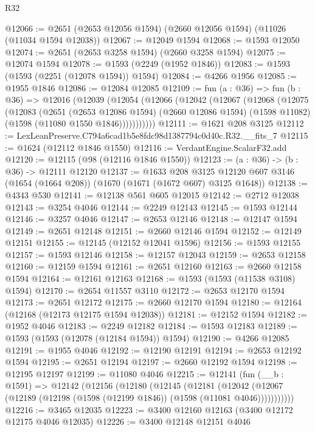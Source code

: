 \begin{lexlean}{R32}
\begin{coremodule}
@12066 := @2651 (@2653 @12056 @1594) (@2660 @12056 @1594) (@11026 (@11034 @1594 @12038))
@12067 := @12049 @1594
@12068 := @1593 @12050
@12074 := @2651 (@2653 @3258 @1594) (@2660 @3258 @1594)
@12075 := @12074 @1594
@12078 := @1593 (@2249 (@1952 @1846))
@12083 := @1593 (@1593 (@2251 (@12078 @1594)) @1594)
@12084 := @4266 @1956
@12085 := @1955 @1846
@12086 := @12084 @12085
@12109 := fun (a : @36) =>
  fun (b : @36) =>
  @12016
    (@12039
      (@12054
        (@12066
          (@12042
            (@12067
              (@12068
                (@12075
                  (@12083
                    (@2651
                      (@2653 @12086 @1594)
                      (@2660 @12086 @1594)
                      (@1598 @11082)
                      (@1598 (@11080 @1550 @1846)))))))))))
@12111 := @1621 @208 @3125
@12112 := LexLeanPreserve.C794a6cad1b5e8fdc98d1387794c0d40c.R32.__fits_7
@12115 := @1624 (@12112 @1846 @1550)
@12116 := VerdantEngine.ScalarF32.add
@12120 := @12115 (@98 (@12116 @1846 @1550))
@12123 := (a : @36) -> (b : @36) -> @12111 @12120
@12137 := @1633
    @208
    @3125
    @12120
    @607
    @3146
    (@1654 (@1664 @208))
    (@1670 (@1671 (@1672 @607) @3125 @1648))
@12138 := @4343 @530
@12141 := @12138 @561 @605 @12015
@12142 := @2712 @12038
@12143 := @3254 @4046
@12144 := @2249 @12143
@12145 := @1593 @12144
@12146 := @3257 @4046
@12147 := @2653 @12146
@12148 := @12147 @1594
@12149 := @2651 @12148
@12151 := @2660 @12146 @1594
@12152 := @12149 @12151
@12155 := @12145 (@12152 @12041 @1596)
@12156 := @1593 @12155
@12157 := @1593 @12146
@12158 := @12157 @12043
@12159 := @2653 @12158
@12160 := @12159 @1594
@12161 := @2651 @12160
@12163 := @2660 @12158 @1594
@12164 := @12161 @12163
@12168 := @1593 (@1593 (@11538 @3108) @1594)
@12170 := @2654 @11557 @3110
@12172 := @2653 @12170 @1594
@12173 := @2651 @12172
@12175 := @2660 @12170 @1594
@12180 := @12164 (@12168 (@12173 @12175 @1594 @12038))
@12181 := @12152 @1594
@12182 := @1952 @4046
@12183 := @2249 @12182
@12184 := @1593 @12183
@12189 := @1593 (@1593 (@12078 (@12184 @1594)) @1594)
@12190 := @4266 @12085
@12191 := @1955 @4046
@12192 := @12190 @12191
@12194 := @2653 @12192 @1594
@12195 := @2651 @12194
@12197 := @2660 @12192 @1594
@12198 := @12195 @12197
@12199 := @11080 @4046
@12215 := @12141
    (fun (__b : @1591) =>
    @12142
      (@12156
        (@12180
          (@12145
            (@12181
              (@12042 (@12067 (@12189 (@12198 (@1598 (@12199 @1846)) (@1598 (@11081 @4046)))))))))))
@12216 := @3465 @12035
@12223 := @3400 @12160 @12163 (@3400 @12172 @12175 @4046 @12035)
@12226 := @3400 @12148 @12151 @4046

\end{coremodule}
\end{lexlean}
